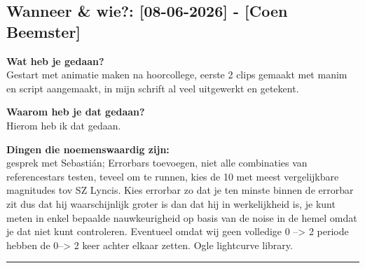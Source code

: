 
\subsection*{Wanneer \& wie?: [08-06-2026] - [Coen Beemster]}

\textbf{Wat heb je gedaan?}\\
Gestart met animatie maken na hoorcollege, eerste 2 clips gemaakt met manim en script aangemaakt, in mijn schrift al veel uitgewerkt en getekent. 
\vspace{0.3cm} 

\noindent \textbf{Waarom heb je dat gedaan?}\\
Hierom heb ik dat gedaan.

\noindent \textbf{Dingen die noemenswaardig zijn:}\\
gesprek met Sebastián; Errorbars toevoegen, niet alle combinaties van referencestars testen, teveel om te runnen, kies de 10 met meest vergelijkbare magnitudes tov SZ Lyncis. Kies errorbar zo dat je ten minste binnen de errorbar zit dus dat hij waarschijnlijk groter is dan dat hij in werkelijkheid is, je kunt meten in enkel bepaalde nauwkeurigheid op basis van de noise in de hemel omdat je dat niet kunt controleren. Eventueel omdat wij geen volledige 0 --> 2 periode hebben de 0--> 2 keer achter elkaar zetten. Ogle lightcurve library.

\vspace{0.5cm}
\hrule 
\vspace{0.5cm}
